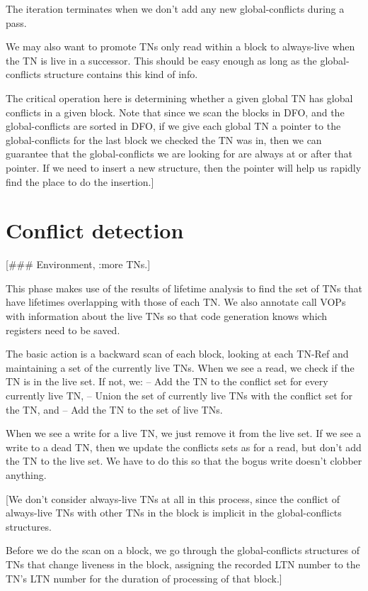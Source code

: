 The iteration terminates when we don't add any new global-conflicts during a
pass.

We may also want to promote TNs only read within a block to always-live when
the TN is live in a successor.  This should be easy enough as long as the
global-conflicts structure contains this kind of info.

The critical operation here is determining whether a given global TN has global
conflicts in a given block.  Note that since we scan the blocks in DFO, and the
global-conflicts are sorted in DFO, if we give each global TN a pointer to the
global-conflicts for the last block we checked the TN was in, then we can
guarantee that the global-conflicts we are looking for are always at or after
that pointer.  If we need to insert a new structure, then the pointer will help
us rapidly find the place to do the insertion.]

\section{Conflict detection}

[\#\#\# Environment, :more TNs.]

This phase makes use of the results of lifetime analysis to find the set of TNs
that have lifetimes overlapping with those of each TN.  We also annotate call
VOPs with information about the live TNs so that code generation knows which
registers need to be saved.

The basic action is a backward scan of each block, looking at each TN-Ref and
maintaining a set of the currently live TNs.  When we see a read, we check if
the TN is in the live set.  If not, we:
 -- Add the TN to the conflict set for every currently live TN,
 -- Union the set of currently live TNs with the conflict set for the TN, and
 -- Add the TN to the set of live TNs.

When we see a write for a live TN, we just remove it from the live set.  If we
see a write to a dead TN, then we update the conflicts sets as for a read, but
don't add the TN to the live set.  We have to do this so that the bogus write
doesn't clobber anything.

[We don't consider always-live TNs at all in this process, since the conflict
of always-live TNs with other TNs in the block is implicit in the
global-conflicts structures.

Before we do the scan on a block, we go through the global-conflicts structures
of TNs that change liveness in the block, assigning the recorded LTN number to
the TN's LTN number for the duration of processing of that block.]
 


